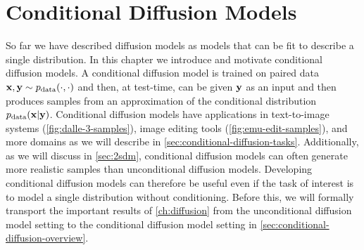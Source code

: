 \chapter{Conditional Diffusion Models} \label{ch:conditional-diffusion}

So far we have described diffusion models as models that can be fit to describe a single distribution. In this chapter we introduce and motivate conditional diffusion models. A conditional diffusion model is trained on paired data ${\mathbf{x}}, {\mathbf{y}} \sim p_\text{data}(\cdot, \cdot)$ and then, at test-time, can be given ${\mathbf{y}}$ as an input and then produces samples from an approximation of the conditional distribution $p_\text{data}({\mathbf{x}}|{\mathbf{y}})$. Conditional diffusion models have applications in text-to-image systems (\cref{fig:dalle-3-samples}), image editing tools (\cref{fig:emu-edit-samples}), and more domains as we will describe in \cref{sec:conditional-diffusion-tasks}. Additionally, as we will discuss in \cref{sec:2sdm}, conditional diffusion models can often generate more realistic samples than unconditional diffusion models. Developing conditional diffusion models can therefore be useful even if the task of interest is to model a single distribution without conditioning. Before this, we will formally transport the important results of \cref{ch:diffusion} from the unconditional diffusion model setting to the conditional diffusion model setting in \cref{sec:conditional-diffusion-overview}.

